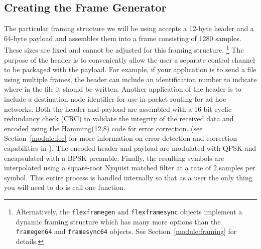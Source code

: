 \subsection{Creating the Frame Generator}
\label{tutorial:framing:framegen}
The particular framing structure we will be using accepts a 12-byte
header and a 64-byte payload and assembles them into a frame
consisting of 1280 samples.
These sizes are fixed and cannot be adjusted for this framing
structure.%
\footnote{
    Alternatively, the {\tt flexframegen} and {\tt flexframesync}
    objects implement a dynamic framing structure which has many more
    options than the {\tt framegen64} and {\tt framesync64} objects.
    See Section~\ref{module:framing} for details.}
The purpose of the header is to conveniently allow the user a separate
control channel to be packaged with the payload.
For example, if your application is to send a file using multiple
frames, the header can include an identification number to indicate
where in the file it should be written.
Another application of the header is to include a destination node
identifier for use in packet routing for ad hoc networks.
Both the header and payload are assembled with a 16-bit cyclic
redundancy check (CRC) to validate the integrity of the received data
and encoded using the Hamming(12,8) code for error correction.
(see Section~\ref{module:fec} for more information on error detection
and correction capabilities in \liquid).
The encoded header and payload are modulated with QPSK and encapsulated
with a BPSK preamble.
Finally, the resulting symbols are interpolated using a square-root
Nyquist matched filter at a rate of 2 samples per symbol.
This entire process is handled internally so that as a user the only
thing you will need to do is call one function.

